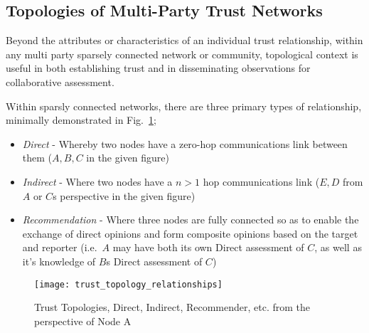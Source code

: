 \subsection{Topologies of Multi-Party Trust Networks}
\label{sec:trust_topologies}
Beyond the attributes or characteristics of an individual trust relationship, within any multi party sparsely connected network or community, topological context is useful in both establishing trust and in disseminating observations for collaborative assessment.

Within sparsly connected networks, there are three primary types of relationship, minimally demonstrated in Fig.~\ref{fig:trust_topology_relationships};

\begin{itemize}
  \item \emph{Direct} - Whereby two nodes have a zero-hop communications link between them ($A,B,C$ in the given figure)
  \item \emph{Indirect} - Where two nodes have a $n>1$ hop communications link ($E,D$ from $A$ or $C$s perspective in the given figure)
  \item \emph{Recommendation} -  Where three nodes are fully connected so as to enable the exchange of direct opinions and form composite opinions based on the target and reporter (i.e.\ $A$ may have both its own Direct assessment of $C$, as well as it's knowledge of $B$s Direct assessment of $C$)
\end{itemize}

\begin{figure}
  \texttt{[image: trust\_topology\_relationships]}
  \caption{Trust Topologies, Direct, Indirect, Recommender, etc. from the perspective of Node A}
  \label{fig:trust_topology_relationships}
\end{figure}


